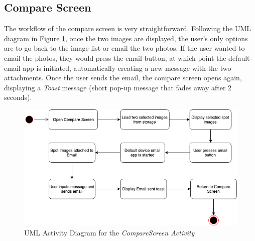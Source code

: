 \subsection{Compare Screen}
The workflow of the compare screen is very straightforward. Following the UML diagram in Figure \ref{fig:CompareScreen}, once the two images are displayed, the user's only options are to go back to the image list or email the two photos. If the user wanted to email the photos, they would press the email button, at which point the default email app is initiated, automatically creating a new message with the two attachments. Once the user sends the email, the compare screen opens again, displaying a \emph{Toast} message (short pop-up message that fades away after 2 seconds).

\begin{figure}
    \includegraphics[width=1.2\textwidth, center]{figures/CompareScreen.png}
    \caption{UML Activity Diagram for the \emph{CompareScreen Activity}}
    \label{fig:CompareScreen}
\end{figure}


